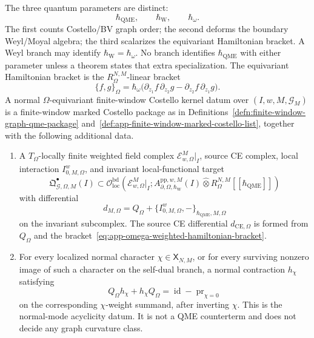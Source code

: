 \begin{defn}
  The three quantum parameters are distinct:
  \[
    \hbar_{\mathrm{QME}},\qquad
    \hbar_{\mathrm{W}},\qquad
    \hbar_\omega .
  \]
  The first counts Costello/BV graph order; the second deforms the
  boundary Weyl/Moyal algebra; the third scalarizes the equivariant
  Hamiltonian bracket.  A Weyl branch may identify
  \(\hbar_{\mathrm{W}}=\hbar_\omega\).  No branch identifies
  \(\hbar_{\mathrm{QME}}\) with either parameter unless a theorem states
  that extra specialization.  The equivariant Hamiltonian bracket is the
  \(R_\Omega^{N,M}\)-linear bracket
  \[
    \{f,g\}_\Omega
      =
    \hbar_\omega
    \bigl(
      \partial_{z_1}f\,\partial_{z_2}g
      -
      \partial_{z_2}f\,\partial_{z_1}g
    \bigr).
    \label{eq:app-omega-weighted-hamiltonian-bracket}
  \]
  A normal \(\Omega\)-equivariant finite-window Costello kernel datum over
  \((I,w,M,\mathcal G_M)\) is a finite-window marked Costello package as in
  Definitions~\ref{defn:finite-window-graph-qme-package}
  and~\ref{def:app-finite-window-marked-costello-list}, together with the
  following additional data.
  \begin{enumerate}[label={(\(\Omega\arabic*\))}]
    \item A \(T_\Omega\)-locally finite weighted field complex
      \(\mathcal E^{M}_{w,\Omega}|_I\), source CE complex, local
      interaction \(I^w_{0,M,\Omega}\), and invariant local-functional
      target
      \[
        \mathfrak Q^\bullet_{\mathcal G,\Omega,M}(I)
        \subset
        \mathcal O^{\mathrm{bd}}_{\mathrm{loc}}
          (\mathcal E^{M}_{w,\Omega}|_I;
           A_{\partial,\Omega,\hbar_{\mathrm{W}}}^{\mathrm{pp},w,M}(I)
           \widehat\otimes R_\Omega^{N,M}
           [[\hbar_{\mathrm{QME}}]])
      \]
      with differential
      \[
        d_{M,\Omega}
          =
        Q_\Omega+
        \{I^w_{0,M,\Omega},-\}_{\hbar_{\mathrm{QME}},M,\Omega}
      \]
      on the invariant subcomplex.  The source CE differential
      \(d_{\mathrm{CE},\Omega}\) is formed from \(Q_\Omega\) and
      the bracket~\eqref{eq:app-omega-weighted-hamiltonian-bracket}.

    \item For every localized normal character
      \(\chi\in\mathsf X_{N,M}\), or for every surviving nonzero image of
      such a character on the self-dual branch, a normal contraction
      \(h_\chi\) satisfying
      \[
        Q_\Omega h_\chi+h_\chi Q_\Omega
          =
        \operatorname{id}-\operatorname{pr}_{\chi=0}
      \]
      on the corresponding \(\chi\)-weight summand, after inverting
      \(\chi\).  This is the normal-mode acyclicity datum.  It is not a
      QME counterterm and does not decide any graph curvature class.


\end{enumerate}
\end{defn}
